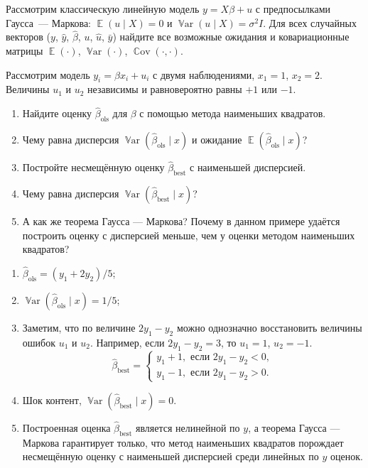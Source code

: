 \documentclass[12pt]{article}
\DeclareMathOperator{\Cov}{\mathbb{C}ov}
\DeclareMathOperator{\Var}{\mathbb{V}ar}
\DeclareMathOperator{\E}{\mathbb{E}}
\newcommand{\hb}{\hat{\beta}}
\newcommand{\hy}{\hat{y}}
\newcommand{\best}{\text{best}}
\newcommand{\ols}{\text{ols}}
\begin{document}
\begin{problem}
Рассмотрим классическую линейную модель $y=X\beta + u$ с предпосылками Гаусса~— Маркова: $\E(u \mid X) = 0$ и $\Var(u \mid X) = \sigma^2 I$.
Для всех случайных векторов ($y$, $\hy$, $\hb$, $u$, $\hat u$, $\bar y$) найдите все возможные ожидания и ковариационные матрицы
$\E(\cdot)$, $\Var(\cdot)$, $\Cov(\cdot, \cdot)$.
\begin{sol}
\end{sol}
\end{problem}

\begin{problem}
Рассмотрим модель $y_i = \beta x_i + u_i$ с двумя наблюдениями, $x_1 = 1$, $x_2 = 2$.
Величины $u_1$ и $u_2$ независимы и равновероятно равны $+1$ или $-1$.


\begin{enumerate}
  \item Найдите оценку $\hb_{\ols}$ для $\beta$ с помощью метода наименьших квадратов. 
  \item Чему равна дисперсия $\Var(\hb_{\ols} \mid x)$ и ожидание $\E(\hb_{\ols} \mid x)$?
  \item Постройте несмещённую оценку $\hb_{\best}$ с наименьшей дисперсией.
  \item Чему равна дисперсия $\Var(\hb_{\best}\mid x)$?
  \item А как же теорема Гаусса — Маркова? Почему в данном примере удаётся построить оценку с дисперсией меньше, чем у оценки методом наименьших квадратов?

\end{enumerate}
  \begin{sol}
    \begin{enumerate}
      \item $\hb_{\ols} = (y_1 + 2y_2)/5$;
      \item $\Var(\hb_{\ols}\mid x) = 1/5$;
      \item Заметим, что по величине $2y_1 - y_2$ можно однозначно восстановить величины ошибок $u_1$ и $u_2$.
      Например, если $2y_1 -y_2 = 3$, то $u_1 = 1$, $u_2 = -1$.
      \[
        \hb_{\best} = \begin{cases}
          y_1 + 1, \text{ если } 2y_1 - y_2 < 0,\\
          y_1 - 1, \text{ если } 2y_1 - y_2 >0.
        \end{cases}
      \]
      \item Шок контент, $\Var(\hb_{\best}\mid x) = 0$.
      \item Построенная оценка $\hb_{\best}$ является нелинейной по $y$, 
      а теорема Гаусса — Маркова гарантирует только, что метод наименьших квадратов 
      порождает несмещённую оценку с наименьшей дисперсией среди линейных по $y$ оценок. 
    \end{enumerate}
        
  \end{sol}
\end{problem}
\end{document}
